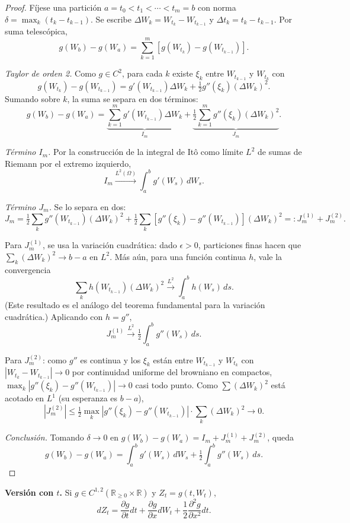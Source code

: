 \documentclass[11pt, a4paper]{article}
\begin{document}
\begin{proof}
Fíjese una partición $a = t_0 < t_1 < \cdots < t_m = b$ con norma $\delta = \max_k (t_k -
t_{k-1})$. Se escribe $\Delta W_k = W_{t_k} - W_{t_{k-1}}$ y $\Delta t_k = t_k - t_{k-1}$.
Por suma telescópica,
$$ g(W_b) - g(W_a) = \sum_{k=1}^m [g(W_{t_k}) - g(W_{t_{k-1}})]. $$

\textit{Taylor de orden 2.} Como $g \in C^2$, para cada $k$ existe $\xi_k$ entre $W_{t_{k-1}}$ y
$W_{t_k}$ con
$$ g(W_{t_k}) - g(W_{t_{k-1}}) = g'(W_{t_{k-1}}) \Delta W_k + \tfrac{1}{2} g''(\xi_k) (\Delta
W_k)^2. $$
Sumando sobre $k$, la suma se separa en dos términos:
$$ g(W_b) - g(W_a) = \underbrace{\sum_{k=1}^m g'(W_{t_{k-1}}) \Delta W_k}_{I_m} +
\underbrace{\tfrac{1}{2} \sum_{k=1}^m g''(\xi_k) (\Delta W_k)^2}_{J_m}. $$

\textit{Término $I_m$.} Por la construcción de la integral de Itô como límite $L^2$ de
sumas de Riemann por el extremo izquierdo,
$$ I_m \xrightarrow{L^2(\Omega)}{} \int_a^b g'(W_s) \, dW_s. $$

\textit{Término $J_m$.} Se lo separa en dos:
$$ J_m = \tfrac{1}{2} \sum_k g''(W_{t_{k-1}}) (\Delta W_k)^2 + \tfrac{1}{2} \sum_k [g''(\xi_k) -
g''(W_{t_{k-1}})] (\Delta W_k)^2 =: J_m^{(1)} + J_m^{(2)}. $$

Para $J_m^{(1)}$, se usa la variación cuadrática: dado $\epsilon > 0$, particiones finas hacen
que $\sum_k (\Delta W_k)^2 \to b - a$ en $L^2$. Más aún, para una función continua
$h$, vale la convergencia
$$ \sum_k h(W_{t_{k-1}}) (\Delta W_k)^2 \xrightarrow{L^2}{} \int_a^b h(W_s) \, ds. $$
(Este resultado es el análogo del teorema fundamental para la variación cuadrática.)
Aplicando con $h = g''$,
$$ J_m^{(1)} \xrightarrow{L^2}{} \tfrac{1}{2} \int_a^b g''(W_s) \, ds. $$

Para $J_m^{(2)}$: como $g''$ es continua y los $\xi_k$ están entre $W_{t_{k-1}}$ y $W_{t_k}$ con
$|W_{t_k} - W_{t_{k-1}}| \to 0$ por continuidad uniforme del browniano en compactos,
$\max_k |g''(\xi_k) - g''(W_{t_{k-1}})| \to 0$ casi todo punto. Como $\sum (\Delta W_k)^2$ está
acotado en $L^1$ (su esperanza es $b - a$),
$$ |J_m^{(2)}| \le \tfrac{1}{2} \max_k |g''(\xi_k) - g''(W_{t_{k-1}})| \cdot \sum_k (\Delta W_k)^2
\xrightarrow{}{} 0. $$

\textit{Conclusión.} Tomando $\delta \to 0$ en
$g(W_b) - g(W_a) = I_m + J_m^{(1)} + J_m^{(2)}$, queda
$$ g(W_b) - g(W_a) = \int_a^b g'(W_s) \, dW_s + \tfrac{1}{2} \int_a^b g''(W_s) \, ds. $$
\end{proof}

\textbf{Versión con $t$.} Si $g \in C^{1, 2}(\mathbb{R}_{\ge 0} \times \mathbb{R})$ y
$Z_t = g(t, W_t)$,
$$ dZ_t = \frac{\partial g}{\partial t} dt + \frac{\partial g}{\partial x} dW_t + \frac{1}{2}
\frac{\partial^2 g}{\partial x^2} dt. $$
\end{document}

